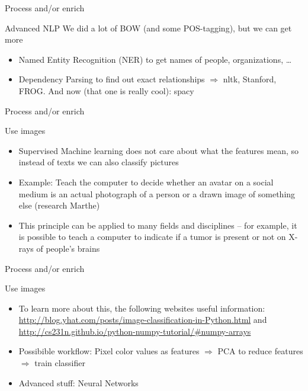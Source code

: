 \documentclass{beamer}
\begin{document}
\begin{frame}{Process and/or enrich}
	\begin{block}{Advanced NLP}
		We did a lot of BOW (and some POS-tagging), but we can get more
		\begin{itemize}
			\item Named Entity Recognition (NER) to get names of people, organizations, \ldots
			\item Dependency Parsing to find out exact relationships
			$\Rightarrow$ nltk, Stanford, FROG. And now (that one is really cool): spacy
		\end{itemize}
	\end{block}
\end{frame}



\begin{frame}{Process and/or enrich}
\begin{block}{Use images}
\begin{itemize}
	\item  Supervised Machine learning does not care about what the features mean, so instead of texts we can also classify pictures
	\item  Example: Teach the computer to decide whether an avatar on a social medium is an actual photograph of a person or a drawn image of something else (research Marthe)
	\item  This principle can be applied to many fields and disciplines -- for example, it is possible to teach a computer to indicate if a tumor is present or not on X-rays of people's brains
\end{itemize}
\end{block}
\end{frame}


\begin{frame}{Process and/or enrich}
	\begin{block}{Use images}
		\begin{itemize}
	\item To learn more about this, the following websites useful information: \url{http://blog.yhat.com/posts/image-classification-in-Python.html} and \url {http://cs231n.github.io/python-numpy-tutorial/\#numpy-arrays}
	\item Possibible workflow: Pixel color values as features $\Rightarrow$ PCA to reduce features  $\Rightarrow$ train classifier
	\item Advanced stuff: Neural Networks
\end{itemize}
	\end{block}
\end{frame}
\end{document}
